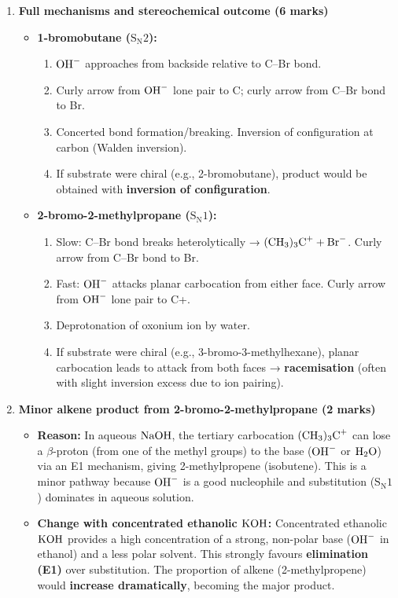 \documentclass[11pt]{article}
\begin{document}
\begin{corrige}
\begin{enumerate}
\item \textbf{Full mechanisms and stereochemical outcome (6 marks)}
   \begin{itemize}
   \item \textbf{1-bromobutane (\(\mathrm{S_N2}\)):}
         \begin{enumerate}
         \item \(\ce{OH-}\) approaches from backside relative to C–Br bond.
         \item Curly arrow from \(\ce{OH-}\) lone pair to C; curly arrow from C–Br bond to Br.
         \item Concerted bond formation/breaking. Inversion of configuration at carbon (Walden inversion).
         \item If substrate were chiral (e.g., 2-bromobutane), product would be obtained with \textbf{inversion of configuration}.
         \end{enumerate}
   \item \textbf{2-bromo-2-methylpropane (\(\mathrm{S_N1}\)):}
         \begin{enumerate}
         \item Slow: C–Br bond breaks heterolytically → \(\ce{(CH3)3C+} + \ce{Br-}\). Curly arrow from C–Br bond to Br.
         \item Fast: \(\ce{OH-}\) attacks planar carbocation from either face. Curly arrow from \(\ce{OH-}\) lone pair to C+.
         \item Deprotonation of oxonium ion by water.
         \item If substrate were chiral (e.g., 3-bromo-3-methylhexane), planar carbocation leads to attack from both faces → \textbf{racemisation} (often with slight inversion excess due to ion pairing).
         \end{enumerate}
   \end{itemize}

\item \textbf{Minor alkene product from 2-bromo-2-methylpropane (2 marks)}
   \begin{itemize}
   \item \textbf{Reason:} In aqueous \(\ce{NaOH}\), the tertiary carbocation \(\ce{(CH3)3C+}\) can lose a \(\beta\)-proton (from one of the methyl groups) to the base (\(\ce{OH-}\) or \(\ce{H2O}\)) via an E1 mechanism, giving 2-methylpropene (isobutene). This is a minor pathway because \(\ce{OH-}\) is a good nucleophile and substitution (\(\mathrm{S_N1}\)) dominates in aqueous solution.
   \item \textbf{Change with concentrated ethanolic \(\ce{KOH}\):} Concentrated ethanolic \(\ce{KOH}\) provides a high concentration of a strong, non-polar base (\(\ce{OH-}\) in ethanol) and a less polar solvent. This strongly favours \textbf{elimination (E1)} over substitution. The proportion of alkene (2-methylpropene) would \textbf{increase dramatically}, becoming the major product.
   \end{itemize}
\end{enumerate}
\end{corrige}
\end{document}

